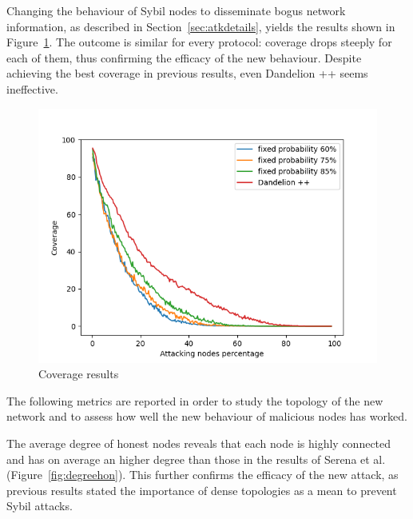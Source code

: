 Changing the behaviour of Sybil nodes to disseminate bogus network information, as described in Section~\ref{sec:atkdetails}, yields the results shown in Figure~\ref{fig:in-cov}. The outcome is similar for every protocol: coverage drops steeply for each of them, thus confirming the efficacy of the new behaviour. Despite achieving the best coverage in previous results, even Dandelion ++ seems ineffective.\par

\begin{figure}[h]
	\includegraphics[width=.8\textwidth]{pict/results/in-cov.png}
	\centering 
	\caption{Coverage results}
	\label{fig:in-cov}
\end{figure}

The following metrics are reported in order to study the topology of the new network and to assess how well the new behaviour of malicious nodes has worked.

The average degree of honest nodes reveals that each node is highly connected and has on average an higher degree than those in the results of Serena et al. (Figure~\ref{fig:degreehon}). This further confirms the efficacy of the new attack, as previous results stated the importance of dense topologies as a mean to prevent Sybil attacks.\par

